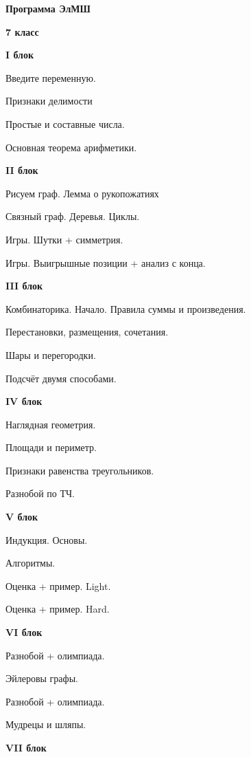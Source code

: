 \centerline{\bf \Huge Программа ЭлМШ}
\centerline{\bf \Huge 7 класс}


\textbf{\Large I блок}

Введите переменную.

Признаки делимости

Простые и составные числа.

Основная теорема арифметики.

\textbf{\Large II блок}

Рисуем граф. Лемма о рукопожатиях

Связный граф. Деревья. Циклы.

Игры. Шутки + симметрия.

Игры. Выигрышные позиции + анализ с конца.


\textbf{\Large III блок}

Комбинаторика. Начало. Правила суммы и произведения.

Перестановки, размещения, сочетания.

Шары и перегородки.

Подсчёт двумя способами.

\textbf{\Large IV блок}

Наглядная геометрия.

Площади и периметр.

Признаки равенства треугольников.

Разнобой по ТЧ.


\newpage

\hspace{3mm}

\textbf{\Large V блок}

Индукция. Основы.

Алгоритмы.

Оценка + пример. Light.

Оценка + пример. Hard.

\textbf{\Large VI блок}

Разнобой + олимпиада.

Эйлеровы графы.

Разнобой + олимпиада.

Мудрецы и шляпы.

\textbf{\Large VII блок}

